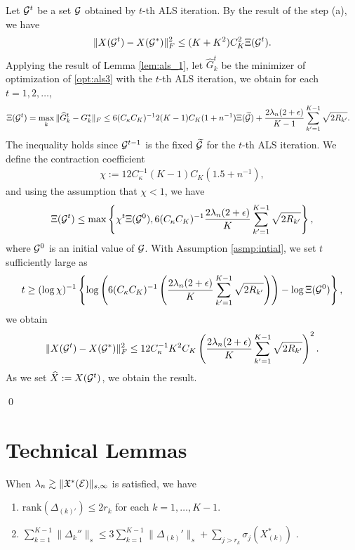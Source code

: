 Let $\mathcal{G}^{t}$ be a set $\mathcal{G}$ obtained by $t$-th ALS iteration.
By the result of the step (a), we have
\begin{align*}
	\|X(\mathcal{G}^t) - X(\mathcal{G}^*)\|_F^2 \leq (K+K^2)C_K^2 \Xi(\mathcal{G}^t).
\end{align*}
Applying the result of Lemma \ref{lem:als_1}, let $\hat{G}_k^t$ be the minimizer of optimization of \eqref{opt:als3} with the $t$-th ALS iteration, we obtain for each $t = 1,2,\ldots$,
\begin{align*}
	&\Xi(\mathcal{G}^t) = \max_{k} \|\widehat{G}_k^t - G_k^*\|_F \leq 6 (C_{\kappa} C_K)^{-1} 2(K-1)C_K(1+n^{-1})  \Xi(\widetilde{\mathcal{G}})  + \frac{2 \lambda_n (2+\epsilon)}{K-1}\sum_{k'=1}^{K-1} \sqrt{2R_{k'}}.
\end{align*}
The inequality holds since $\mathcal{G}^{t-1}$ is the fixed $\widetilde{\mathcal{G}}$ for the $t$-th ALS iteration.
We define the contraction coefficient
\begin{align*}
	\chi := 12C_{\kappa}^{-1} (K-1)C_K(1.5+n^{-1}),
\end{align*}
and using the assumption that $\chi < 1$, we have
\begin{align}
	\Xi(\mathcal{G}^t) \leq \max \left\{ \chi^t \Xi(\mathcal{G}^0), 6 (C_{\kappa} C_K)^{-1}   \frac{2 \lambda_n (2 + \epsilon)}{K}\sum_{k'=1}^{K-1} \sqrt{2R_{k'}} \right\}, \label{ineq:xi}
\end{align}
where $\mathcal{G}^0$ is an initial value of $\mathcal{G}$.
With Assumption \ref{asmp:intial}, we set $t$ sufficiently large as 
\begin{align*}
	t \geq (\log \chi)^{-1} \left\{\log \left( 6 (C_{\kappa} C_K)^{-1}  \left( \frac{2 \lambda_n (2 + \epsilon)}{K}\sum_{k'=1}^{K-1} \sqrt{2R_{k'}}\right) \right) - \log \Xi(\mathcal{G}^0)\right\},
\end{align*}
we obtain
\begin{align*}
	\|X(\mathcal{G}^t) - X(\mathcal{G}^*)\|_F^2 \leq 12 C_{\kappa}^{-1} K^2C_K \left( \frac{2 \lambda_n (2 + \epsilon)}{K}\sum_{k'=1}^{K-1} \sqrt{2R_{k'}} \right)^2.
\end{align*}
As we set $\widehat{X} := X(\mathcal{G}^t)$, we obtain the result.

\qed




\section{Technical Lemmas}

\begin{lemma}\label{lem:neg}
	When $\lambda_n \gtrsim \|\mathfrak{X}^*(\mathcal{E})\|_{s,\infty}$ is satisfied, we have
	\begin{enumerate}
		\item $\mbox{rank}(\Delta_{(k)'}) \leq 2 r_k$ for each $k = 1,\ldots, K-1$.
		\item $\sum_{k=1}^{K-1} \|\Delta_k''\|_s \leq 3 \sum_{k=1}^{K-1} \|\Delta_{(k)}'\|_s + \sum_{j > r_k} \sigma_j(X^*_{(k)})$ .
	\end{enumerate}
\end{lemma}

